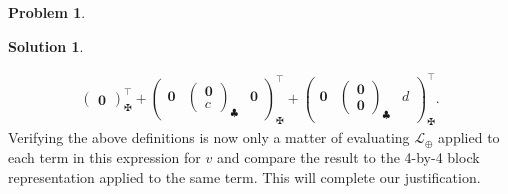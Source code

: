 \documentclass{book}
\theoremstyle{definition}
\newtheorem*{prob*}{Problem}
\newtheorem*{sln*}{Solution}
\newcommand{\lag}{\mathcal{L}}
\begin{document}
\begin{prob*}
\begin{sln*}
\begin{enumerate}
\begin{align*}
\begin{pmatrix}
		\mathbf{0}
		\end{pmatrix}^\top_\maltese
		+
		\begin{pmatrix}
		\mathbf{0} & \begin{pmatrix}
		\mathbf{0}\\c
		\end{pmatrix}_\clubsuit&
		\mathbf{0}
		\end{pmatrix}^\top_\maltese
		+
		\begin{pmatrix}
		\mathbf{0} & \begin{pmatrix}
		\mathbf{0}\\\mathbf{0}
		\end{pmatrix}_\clubsuit&
		d
		\end{pmatrix}^\top_\maltese.
		\end{align*}
		Verifying the above definitions is now only a matter of evaluating $\lag_\oplus$ applied to each term in this expression for $v$ and compare the result to the 4-by-4 block representation applied to the same term. This will complete our justification.
		
	\end{enumerate}
\end{sln*}
\end{prob*}




\newpage
\end{document}
